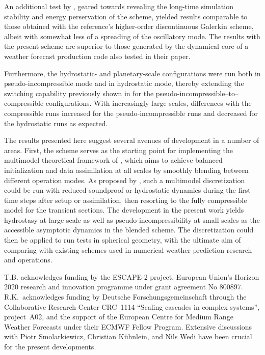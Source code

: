 \documentclass{ametsoc}
\theoremstyle{definition}
\begin{document}
An additional test by \citet{BaldaufBrdar2013}, geared towards revealing the long-time simulation stability and energy perservation of the scheme, yielded results comparable to those obtained with the reference's higher-order discontinuous Galerkin scheme, albeit with somewhat less of a spreading of the oscillatory mode. The results with the present scheme are superior to those generated by the dynamical core of a weather forecast production code also tested in their paper. 

Furthermore, the hydrostatic- and planetary-scale configurations were run both in pseudo-incompressible mode and in hydrostatic mode, thereby extending the switching capability previously shown in \cite{BenacchioEtAl2014} for the pseudo-incompressible--to--compressible configurations. With increasingly large scales, differences with the compressible runs increased for the pseudo-incompressible runs and decreased for the hydrostatic runs as expected.

The results presented here suggest several avenues of development in a number of areas. First, the scheme serves as the starting point for implementing the multimodel theoretical framework of \cite{KleinBenacchio2016}, which aims to achieve balanced initialization and data assimilation at all scales by smoothly blending between different operation modes. As proposed by \cite{BenacchioEtAl2014}, such a multimodel discretization could be run with reduced soundproof or hydrostatic dynamics during the first time steps after setup or assimilation, then resorting to the fully compressible model for the transient sections. The development in the present work yields hydrostasy at large scale as well as pseudo-incompressibility at small scales as the accessible asymptotic dynamics in the blended scheme. The discretization could then be applied to run tests in spherical geometry, with the ultimate aim of comparing with existing schemes used in numerical weather prediction research and operations.

\acknowledgments

T.B. acknowledges funding by the ESCAPE-2 project, European Union's Horizon 2020 research and innovation programme under grant agreement No 800897. R.K.\ acknowledges funding by Deutsche Forschungsgemeinschaft through the Collaborative Research Center CRC~1114 ``Scaling cascades in complex systems'', project~A02, and the support of the European Centre for Medium Range Weather Forecasts under their ECMWF Fellow Program. Extensive discussions with Piotr Smolarkiewicz, Christian K\"uhnlein, and Nils Wedi have been crucial for the present developments. 




\end{document}
